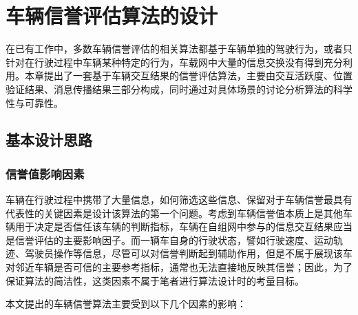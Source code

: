 
\chapter{车辆信誉评估算法的设计}

在已有工作中，多数车辆信誉评估的相关算法都基于车辆单独的驾驶行为，或者只针对在行驶过程中车辆某种特定的行为，车载网中大量的信息交换没有得到充分利用。本章提出了一套基于车辆交互结果的信誉评估算法，主要由交互活跃度、位置验证结果、消息传播结果三部分构成，同时通过对具体场景的讨论分析算法的科学性与可靠性。

\section{基本设计思路}
\subsection{信誉值影响因素}

车辆在行驶过程中携带了大量信息，如何筛选这些信息、保留对于车辆信誉最具有代表性的关键因素是设计该算法的第一个问题。考虑到车辆信誉值本质上是其他车辆用于决定是否信任该车辆的判断指标，车辆在自组网中参与的信息交互结果应当是信誉评估的主要影响因子。而一辆车自身的行驶状态，譬如行驶速度、运动轨迹、驾驶员操作等信息，尽管可以对信誉判断起到辅助作用，但是不属于展现该车对邻近车辆是否可信的主要参考指标，通常也无法直接地反映其信誉；因此，为了保证算法的简洁性，这类因素不属于笔者进行算法设计时的考量目标。

本文提出的车辆信誉算法主要受到以下几个因素的影响：

